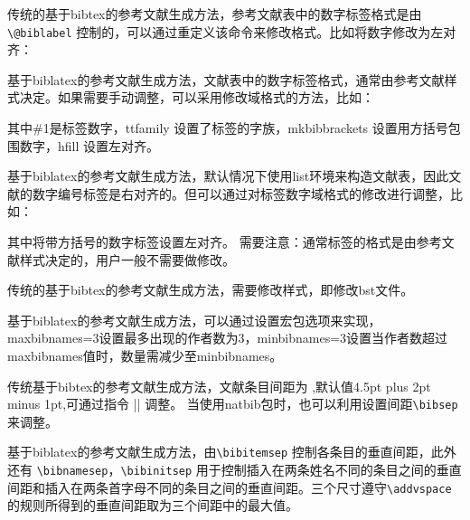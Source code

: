 传统的基于bibtex的参考文献生成方法，参考文献表中的数字标签格式是由 \verb|\@biblabel| 控制的，可以通过重定义该命令来修改格式。比如将数字修改为左对齐：
\begin{texlist}
\makeatletter
\renewcommand\@biblabel[1]{[#1]\hfill}
\makeatother
\end{texlist}

基于biblatex的参考文献生成方法，文献表中的数字标签格式，通常由参考文献样式决定。如果需要手动调整，可以采用修改域格式的方法，比如：
\begin{texlist}
\end{texlist}
其中\#1是标签数字，ttfamily 设置了标签的字族，mkbibbrackets 设置用方括号包围数字，hfill 设置左对齐。




基于biblatex的参考文献生成方法，默认情况下使用list环境来构造文献表，因此文献的数字编号标签是右对齐的。但可以通过对标签数字域格式的修改进行调整，比如：
\begin{texlist}
\end{texlist}
其中将带方括号的数字标签设置左对齐。
需要注意：通常标签的格式是由参考文献样式决定的，用户一般不需要做修改。





传统的基于bibtex的参考文献生成方法，需要修改样式，即修改bst文件。

基于biblatex的参考文献生成方法，可以通过设置宏包选项来实现，maxbibnames=3设置最多出现的作者数为3，minbibnames=3设置当作者数超过maxbibnames值时，数量需减少至minbibnames。






传统基于bibtex的参考文献生成方法，文献条目间距为 ,默认值4.5pt plus 2pt minus
1pt,可通过指令 |\addtolength{\itemsep}{距离}| 调整。
当使用natbib包时，也可以利用设置间距\verb|\bibsep|来调整。

基于biblatex的参考文献生成方法，由\verb|\bibitemsep| 控制各条目的垂直间距，此外还有
\verb|\bibnamesep|，\verb|\bibinitsep| 用于控制插入在两条姓名不同的条目之间的垂直间距和插入在两条首字母不同的条目之间的垂直间距。三个尺寸遵守\verb|\addvspace| 的规则所得到的垂直间距取为三个间距中的最大值。


